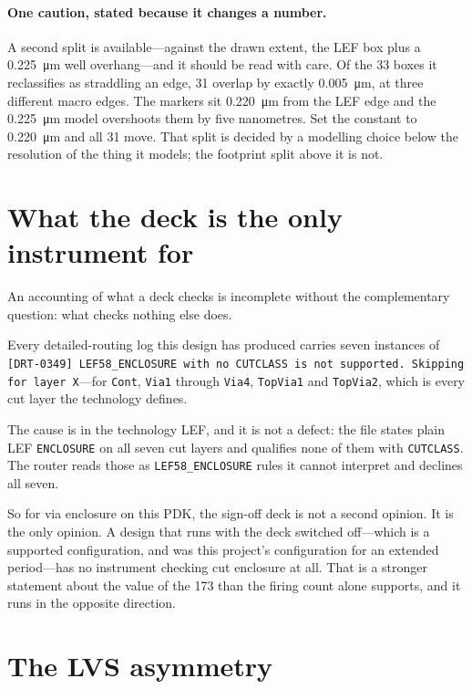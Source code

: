 \documentclass[11pt,a4paper]{article}
\begin{document}
\paragraph{One caution, stated because it changes a number.} A second
split is available---against the drawn extent, the LEF box plus a
\SI{0.225}{\micro\meter} well overhang---and it should be read with care.
Of the \num{33} boxes it reclassifies as straddling an edge, \num{31}
overlap by exactly \SI{0.005}{\micro\meter}, at three different macro
edges. The markers sit \SI{0.220}{\micro\meter} from the LEF edge and the
\SI{0.225}{\micro\meter} model overshoots them by five nanometres. Set
the constant to \SI{0.220}{\micro\meter} and all \num{31} move. That
split is decided by a modelling choice below the resolution of the thing
it models; the footprint split above it is not.

\section{What the deck is the only instrument for}
\label{sec:router}

An accounting of what a deck checks is incomplete without the
complementary question: what checks nothing else does.

Every detailed-routing log this design has produced carries seven
instances of
\texttt{[DRT-0349] LEF58\_ENCLOSURE with no CUTCLASS is not supported.
Skipping for layer X}---for \texttt{Cont}, \texttt{Via1} through
\texttt{Via4}, \texttt{TopVia1} and \texttt{TopVia2}, which is every cut
layer the technology defines.

The cause is in the technology LEF, and it is not a defect: the file
states plain LEF \texttt{ENCLOSURE} on all seven cut layers and qualifies
none of them with \texttt{CUTCLASS}. The router reads those as
\texttt{LEF58\_ENCLOSURE} rules it cannot interpret and declines all
seven.

So for via enclosure on this PDK, the sign-off deck is not a second
opinion. It is the only opinion. A design that runs with the deck
switched off---which is a supported configuration, and was this project's
configuration for an extended period---has no instrument checking cut
enclosure at all. That is a stronger statement about the value of the
\num{173} than the firing count alone supports, and it runs in the
opposite direction.

\section{The LVS asymmetry}
\label{sec:lvs}
\end{document}
